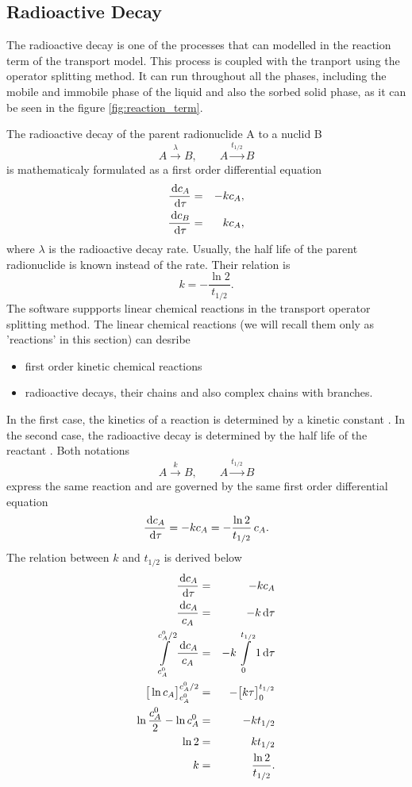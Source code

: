 \subsection{Radioactive Decay}
\label{sec:decay}
The radioactive decay is one of the processes that can modelled in the reaction term of the transport model.
This process is coupled with the tranport using the operator splitting method.
It can run throughout all the phases, including the mobile and immobile phase of the liquid 
and also the sorbed solid phase, as it can be seen in the figure \ref{fig:reaction_term}.

The radioactive decay of the parent radionuclide A to a nuclid B
%
\[ A\xrightarrow{\lambda} B, \qquad A\xrightarrow{t_{1/2}} B \]
%
is mathematicaly formulated as a first order differential equation
%
\begin{eqnarray} \label{eqn:halflife}
  \frac{\d c_A}{\d\tau} &=& -k c_A, \\
  \frac{\d c_B}{\d\tau} &=& k c_A,
\end{eqnarray}
%
where $\lambda$ is the radioactive decay rate. Usually, the half life of the parent radionuclide is known 
instead of the rate. Their relation is
%
\begin{equation} \label{eqn:halflife}
  k = - \frac{\ln 2}{t_{1/2}}.
\end{equation}
%
\label{sec:linear_reactions}
The software suppports linear chemical reactions in the transport operator splitting method. 
The linear chemical reactions (we will recall them only as 'reactions' in this section) can desribe
\begin{itemize}
  \item first order kinetic chemical reactions
  \item radioactive decays, their chains and also complex chains with branches.
\end{itemize}
In the first case, the kinetics of a reaction is determined by a kinetic constant . 
In the second case, the radioactive decay is determined by the half life of the reactant 
. Both notations
%
\[ A\xrightarrow{k} B, \qquad A\xrightarrow{t_{1/2}} B \]
%
express the same reaction and are governed by the same first order differential equation 
%
\[ \frac{\,{\rm d} c_A}{\,{\rm d}\tau} = -kc_A = - \frac{\ln 2}{t_{1/2}}\, c_A. \]
%
The relation between $k$ and $t_{1/2}$ is derived below
\begin{eqnarray*}
    \frac{\,{\rm d} c_A}{\,{\rm d}\tau} &=& -k c_A\\
    \frac{\,{\rm d} c_A}{c_A} &=& -k \,{\rm d}\tau\\
    \int\limits_{c_A^0}^{c_A^0/2}\frac{\,{\rm d} c_A}{c_A} &=& -k\int\limits_{0}^{t_{1/2}} 1\,{\rm d}\tau\\
    \big[ \ln c_A\big]^{c_A^0/2}_{c_A^0} &=& -\big[k\tau\big]^{t_{1/2}}_{0}\\
    \ln\frac{c_A^0}{2} - \ln c_A^0 &=& - k t_{1/2}\\
    \ln 2 &=& k t_{1/2}\\
    k &=& \frac{\ln 2}{t_{1/2}}.
\end{eqnarray*}



